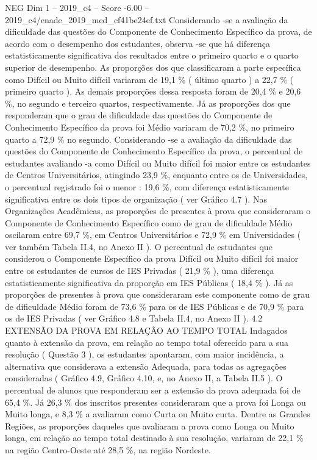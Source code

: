 \begin{textsample}{NEG Dim 1 – 2019\_c4 – Score -6.00 – 2019\_c4/enade\_2019\_med\_cf41be24ef.txt}
Considerando -se a avaliação da dificuldade das questões do Componente de Conhecimento Específico da prova, de acordo com o desempenho dos estudantes, observa -se que há diferença estatisticamente significativa dos resultados entre o primeiro quarto e o quarto superior de desempenho.
As proporções dos que classificaram a parte específica como Difícil ou Muito difícil variaram de 19,1 \% ( último quarto ) a 22,7 \% ( primeiro quarto ).
As demais proporções dessa resposta foram de 20,4 \% e 20,6 \%, no segundo e terceiro quartos, respectivamente.
Já as proporções dos que responderam que o grau de dificuldade das questões do Componente de Conhecimento Específico da prova foi Médio variaram de 70,2 \%, no primeiro quarto a 72,9 \% no segundo.
Considerando -se a avaliação da dificuldade das questões do Componente de Conhecimento Específico da prova, o percentual de estudantes avaliando -a como Difícil ou Muito difícil foi maior entre os estudantes de Centros Universitários, atingindo 23,9 \%, enquanto entre os de Universidades, o percentual registrado foi o menor : 19,6 \%, com diferença estatisticamente significativa entre os dois tipos de organização ( ver Gráfico 4.7 ).
Nas Organizações Acadêmicas, as proporções de presentes à prova que consideraram o Componente de Conhecimento Específico como de grau de dificuldade Médio oscilaram entre 69,7 \%, em Centros Universitários e 72,9 \% em Universidades ( ver também Tabela II.4, no Anexo II ).
O percentual de estudantes que considerou o Componente Específico da prova Difícil ou Muito difícil foi maior entre os estudantes de cursos de IES Privadas ( 21,9 \% ), uma diferença estatisticamente significativa da proporção em IES Públicas ( 18,4 \% ).
Já as proporções de presentes à prova que consideraram este componente como de grau de dificuldade Médio foram de 73,6 \% para os de IES Públicas e de 70,9 \% para os de IES Privadas ( ver Gráfico 4.8 e Tabela II.4, no Anexo II ). 4.2 EXTENSÃO DA PROVA EM RELAÇÃO AO TEMPO TOTAL Indagados quanto à extensão da prova, em relação ao tempo total oferecido para a sua resolução ( Questão 3 ), os estudantes apontaram, com maior incidência, a alternativa que considerava a extensão Adequada, para todas as agregações consideradas ( Gráfico 4.9, Gráfico 4.10, e, no Anexo II, a Tabela II.5 ).
O percentual de alunos que responderam ser a extensão da prova adequada foi de 65,4 \%.
Já 26,3 \% dos inscritos presentes consideraram que a prova foi Longa ou Muito longa, e 8,3 \% a avaliaram como Curta ou Muito curta.
Dentre as Grandes Regiões, as proporções daqueles que avaliaram a prova como Longa ou Muito longa, em relação ao tempo total destinado à sua resolução, variaram de 22,1 \% na região Centro-Oeste até 28,5 \%, na região Nordeste.

\end{textsample}
